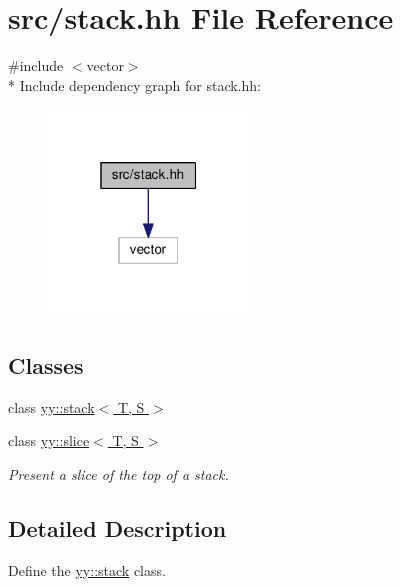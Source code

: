 \hypertarget{src_2stack_8hh}{}\section{src/stack.hh File Reference}
\label{src_2stack_8hh}
{\ttfamily \#include $<$vector$>$}\\*
Include dependency graph for stack.\+hh\+:\nopagebreak
\begin{figure}[H]
\begin{center}
\leavevmode
\includegraphics[width=151pt]{src_2stack_8hh__incl}
\end{center}
\end{figure}
\subsection*{Classes}
\begin{DoxyCompactItemize}
\item 
class \hyperlink{classyy_1_1stack}{yy\+::stack$<$ T, S $>$}
\item 
class \hyperlink{classyy_1_1slice}{yy\+::slice$<$ T, S $>$}
\begin{DoxyCompactList}\small\item\em Present a slice of the top of a stack. \end{DoxyCompactList}\end{DoxyCompactItemize}


\subsection{Detailed Description}
Define the \hyperlink{classyy_1_1stack}{yy\+::stack} class. 